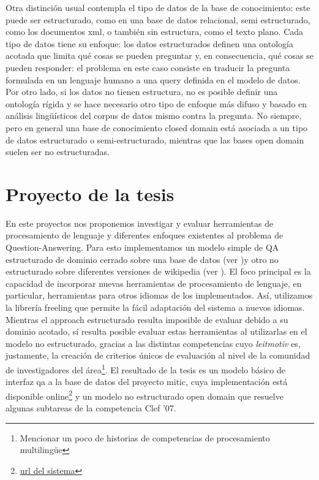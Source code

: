 \bigskip

Otra distinción usual contempla el tipo de datos de la base de
conocimiento: este puede ser estructurado, como en una base de datos
relacional, semi estructurado, como los documentos xml, o también sin
estructura, como el texto plano. Cada tipo de datos tiene su enfoque:
los datos estructurados definen una ontología acotada que limita
qué cosas se pueden preguntar y, en consecuencia, qué cosas se pueden responder: el
problema en este caso consiste en traducir la pregunta formulada en un lenguaje humano a una query
definida en el modelo de datos. Por otro lado, si los datos no
tienen estructura, no es posible definir una ontología rígida y se
hace necesario otro tipo de enfoque más difuso y basado en análisis
lingüísticos del corpus de datos mismo contra la pregunta. No siempre, 
pero en general una base de conocimiento closed domain está asociada
a un tipo de datos estructurado o semi-estructurado, mientras que las bases open domain
suelen ser no estructuradas.

\section{Proyecto de la tesis}

En este proyectos nos proponemos investigar y evaluar herramientas de procesamiento de lenguaje y diferentes enfoques existentes al problema
de Question-Answering. Para esto implementamos un modelo simple de QA estructurado de dominio cerrado sobre una base de datos (ver )y otro 
no estructurado sobre diferentes versiones de wikipedia (ver ). El foco principal es la capacidad de incorporar nuevas herramientas de procesamiento de lenguaje, en particular,
herramientas para otros idiomas de los implementados. Así, utilizamos la librería freeling que permite la fácil adaptación del sistema a nuevos idiomas.
Mientras el approach estructurado resulta imposible de evaluar debido a su dominio acotado, sí resulta posible evaluar estas herramientas al utilizarlas en el modelo no estructurado, gracias a las distintas competencias cuyo \textit{leitmotiv} es, justamente, la creación de criterios únicos de evaluación al nivel de la comunidad de investigadores del área\footnote{{\color{red} Mencionar un poco de historias de competencias de procesamiento multilingüe}}. El resultado de la tesis es un modelo básico de interfaz qa a la base de datos del proyecto mitic, cuya implementación está disponible online\footnote{{\color{red}\url{url del sistema}}} y un modelo no estructurado open domain que resuelve algunas subtareas de la competencia Clef '07.


